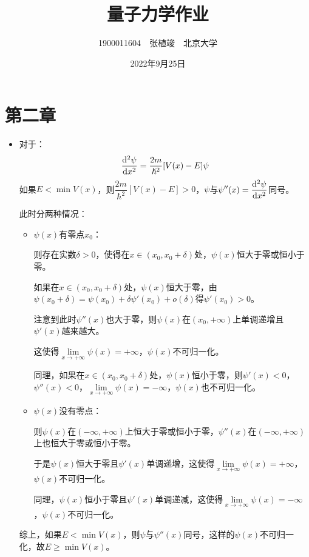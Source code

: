 \documentclass[a4paper,fontset=none]{ctexart}
\title{\textbf{量子力学作业}}
\author{1900011604\ \ 张植竣\ \ 北京大学}
\date{2022年9月25日}
\renewcommand\hbar\hslash
\renewcommand\geq\geqslant
\begin{document}
\maketitle

    \section*{第二章}

    \begin{itemize}
        \item[2.]
        对于：
        \[
            \dv[2]{\psi}{x} = \frac{2m}{\hbar^2}[V(x) - E]\psi
        \]
        如果$E < \min{V(x)}$，则$\dfrac{2m}{\hbar^2}[V(x) - E] > 0$，$\psi$与$\displaystyle \psi''(x) = \dv[2]{\psi}{x}$同号。

        此时分两种情况：
        \begin{itemize}
            \item[\textcircled{1}] $\psi(x)$有零点$x_0$：

            则存在实数$\delta > 0$，使得在$x \in (x_0, x_0+\delta)$处，$\psi(x)$恒大于零或恒小于零。

            如果在$x \in (x_0, x_0+\delta)$处，$\psi(x)$恒大于零，由$\psi(x_0 + \delta) = \psi(x_0) + \delta \psi'(x_0) + o(\delta)$得$\psi'(x_0) > 0$。

            注意到此时$\psi''(x)$也大于零，则$\psi(x)$在$(x_0, +\infty)$上单调递增且$\psi'(x)$越来越大。

            这使得$\lim\limits_{x \to +\infty} \psi(x) = +\infty$，$\psi(x)$不可归一化。

            同理，如果在$x \in (x_0, x_0+\delta)$处，$\psi(x)$恒小于零，则$\psi'(x) < 0$，$\psi''(x) < 0$，$\lim\limits_{x \to +\infty} \psi(x) = -\infty$，$\psi(x)$也不可归一化。

            \item[\textcircled{2}] $\psi(x)$没有零点：

            则$\psi(x)$在$(-\infty, +\infty)$上恒大于零或恒小于零，$\psi''(x)$在$(-\infty, +\infty)$上也恒大于零或恒小于零。

            于是$\psi(x)$恒大于零且$\psi'(x)$单调递增，这使得$\lim\limits_{x \to +\infty} \psi(x) = +\infty$，$\psi(x)$不可归一化。

            同理，$\psi(x)$恒小于零且$\psi'(x)$单调递减，这使得$\lim\limits_{x \to +\infty} \psi(x) = -\infty$，$\psi(x)$不可归一化。
        \end{itemize}
        综上，如果$E < \min{V(x)}$，则$\psi$与$\psi''(x)$同号，这样的$\psi(x)$不可归一化，故$E \geq \min{V(x)}$。


\end{itemize}
\end{document}
